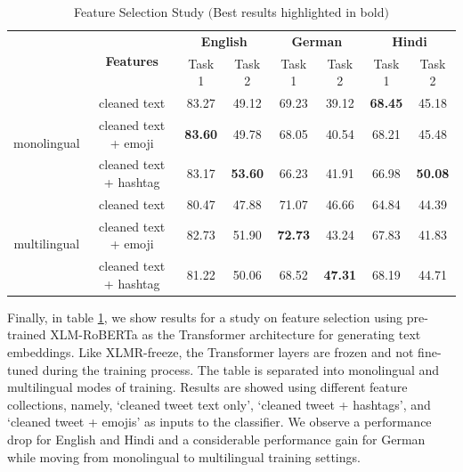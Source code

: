 \documentclass[
]{ceurart}
\begin{document}
\begin{table}
  \begin{tabular*}{\textwidth}{c@{\extracolsep{\fill}} ccccccc}
    \toprule
    & \multirow{2}{*}{\textbf{Features}} & \multicolumn{2}{c}{\textbf{English}} & \multicolumn{2}{c}{\textbf{German}} & \multicolumn{2}{c}{\textbf{Hindi}} \\\cmidrule{3-4} \cmidrule{5-6} \cmidrule{7-8}
    & & Task 1 & Task 2 & Task 1 & Task 2 & Task 1 & Task 2 \\ \midrule
\multirow{3}{*}{monolingual}& cleaned text & 83.27 & 49.12 & 69.23 & 39.12 & \textbf{68.45} & 45.18 \\
& cleaned text + emoji & \textbf{83.60} & 49.78 & 68.05 & 40.54 & 68.21 & 45.48 \\ %
& cleaned text + hashtag & 83.17 & \textbf{53.60} & 66.23 & 41.91 & 66.98 & \textbf{50.08} \\ \midrule %
\multirow{3}{*}{multilingual}& cleaned text & 80.47 & 47.88 & 71.07 & 46.66 & 64.84 & 44.39 \\ 
& cleaned text + emoji & 82.73 & 51.90 & \textbf{72.73} & 43.24 & 67.83 & 41.83 \\ %
&cleaned text + hashtag & 81.22 & 50.06 & 68.52 & \textbf{47.31} & 68.19 & 44.71 \\ %
\end{tabular*}
\caption{Feature Selection Study $($Best results highlighted in bold$)$}
\label{tab:monobase}
\end{table}

Finally, in table \ref{tab:monobase}, we show results for a study on feature selection using pre-trained XLM-RoBERTa as the Transformer architecture for generating text embeddings. Like XLMR-freeze, the Transformer layers are frozen and not fine-tuned during the training process. The table is separated into monolingual and multilingual modes of training. Results are showed using different feature collections, namely, `cleaned tweet text only',  `cleaned tweet + hashtags', and `cleaned tweet + emojis' as inputs to the classifier. We observe a performance drop for English and Hindi and a considerable performance gain for German while moving from monolingual to multilingual training settings.
\end{document}
